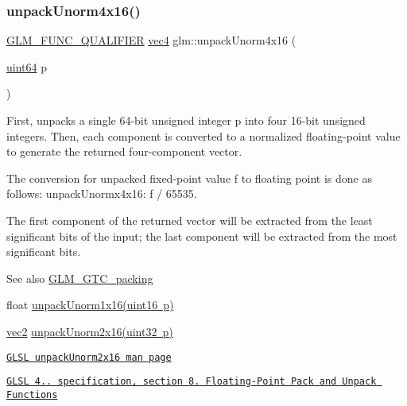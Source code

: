 \subsubsection{\texorpdfstring{unpack\+Unorm4x16()}{unpackUnorm4x16()}}
{\footnotesize\ttfamily \mbox{\hyperlink{setup_8hpp_a33fdea6f91c5f834105f7415e2a64407}{G\+L\+M\+\_\+\+F\+U\+N\+C\+\_\+\+Q\+U\+A\+L\+I\+F\+I\+ER}} \mbox{\hyperlink{group__core__types_ga5881b1b022d7fd1b7218f5916532dd02}{vec4}} glm\+::unpack\+Unorm4x16 (\begin{DoxyParamCaption}\item[{\mbox{\hyperlink{group__gtc__type__precision_gae3632bf9b37da66233d78930dd06378a}{uint64}}}]{p }\end{DoxyParamCaption})}

First, unpacks a single 64-\/bit unsigned integer p into four 16-\/bit unsigned integers. Then, each component is converted to a normalized floating-\/point value to generate the returned four-\/component vector.

The conversion for unpacked fixed-\/point value f to floating point is done as follows\+: unpack\+Unormx4x16\+: f / 65535.

The first component of the returned vector will be extracted from the least significant bits of the input; the last component will be extracted from the most significant bits.

\begin{DoxySeeAlso}{See also}
\mbox{\hyperlink{group__gtc__packing}{G\+L\+M\+\_\+\+G\+T\+C\+\_\+packing}} 

float \mbox{\hyperlink{group__gtc__packing_ga7770e3ade4f4764cc1b2eb42ac4ec188}{unpack\+Unorm1x16(uint16 p)}} 

\mbox{\hyperlink{group__core__types_gaa1618f51db67eaa145db101d8c8431d8}{vec2}} \mbox{\hyperlink{group__core__func__packing_ga1f66188e5d65afeb9ffba1ad971e4007}{unpack\+Unorm2x16(uint32 p)}} 

\href{http://www.opengl.org/sdk/docs/manglsl/xhtml/unpackUnorm2x16.xml}{\tt G\+L\+SL unpack\+Unorm2x16 man page} 

\href{http://www.opengl.org/registry/doc/GLSLangSpec.4.20.8.pdf}{\tt G\+L\+SL 4.. specification, section 8. Floating-\/\+Point Pack and Unpack Functions} 
\end{DoxySeeAlso}
\mbox{\label{group__gtc__packing_ga38a0a518d53e15a9481c31dc1e574a40}} 
